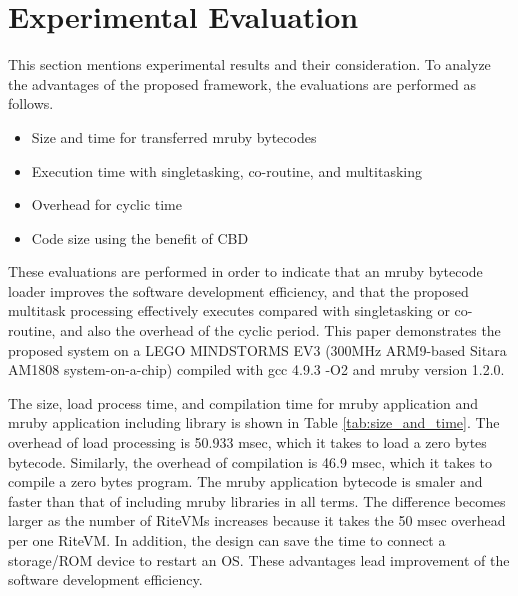 \documentclass[submit]{ipsj_v2/UTF8/ipsj}
\begin{document}
\section{Experimental Evaluation}
\label{sec:Evaluation}
This section mentions experimental results and their consideration.
To analyze the advantages of the proposed framework, the evaluations are performed as follows.
\begin{itemize}
    \item Size and time for transferred mruby bytecodes
    \item Execution time with singletasking, co-routine, and multitasking
    \item Overhead for cyclic time
    \item Code size using the benefit of CBD 
\end{itemize}

These evaluations are performed in order to indicate that an mruby bytecode loader improves the software development efficiency, and that the proposed multitask processing effectively executes compared with singletasking or co-routine, and also the overhead of the cyclic period.
This paper demonstrates the proposed system on a LEGO MINDSTORMS EV3 (300MHz ARM9-based Sitara AM1808 system-on-a-chip) compiled with gcc 4.9.3 -O2 and mruby version 1.2.0.

The size, load process time, and compilation time for mruby application and mruby application including library is shown in Table \ref{tab:size_and_time}.
The overhead of load processing is 50.933 msec, which it takes to load a zero bytes bytecode.
Similarly, the overhead of compilation is 46.9 msec, which it takes to compile a zero bytes program.
The mruby application bytecode is smaler and faster than that of including mruby libraries in all terms.
The difference becomes larger as the number of RiteVMs increases because it takes the 50 msec overhead per one RiteVM. 
In addition, the design can save the time to connect a storage/ROM device to restart an OS.
These advantages lead improvement of the software development efficiency.
\end{document}
